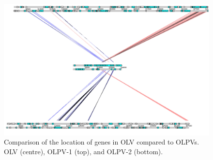 \begin{figure}
\includegraphics[width=\textwidth]{olv_figures/OLV_OLPV_compare.jpg}
\caption[Genomic comparison of \acs{OLV} with \acp{OLPV}]{Comparison of the location of genes in \ac{OLV} compared to \acp{OLPV}. \ac{OLV} (centre), \ac{OLPV}-1 (top), and \ac{OLPV}-2 (bottom).
}
\label{fig:OLV_OLPV_compare}

\end{figure}
